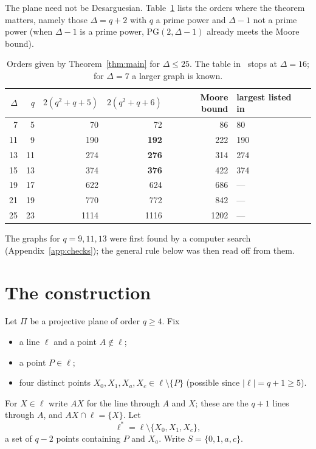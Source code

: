 \documentclass[11pt]{amsart}
\theoremstyle{remark}
\newcommand{\PG}{\mathrm{PG}}
\begin{document}
The plane need not be Desarguesian. Table~\ref{tab:values} lists the orders where the theorem matters, namely those $\Delta = q+2$ with $q$ a prime power and $\Delta - 1$ not a prime power (when $\Delta-1$ is a prime power, $\PG(2,\Delta-1)$ already meets the Moore bound).

\begin{table}[h]
\centering
\begin{tabular}{rrrrrl}
\toprule
$\Delta$ & $q$ & $2(q^2+q+5)$ & $2(q^2+q+6)$ & Moore bound & largest listed in~\cite{wiki}\\
\midrule
7 & 5 & 70 & 72 & 86 & 80 \\
11 & 9 & 190 & \textbf{192} & 222 & 190 \\
13 & 11 & 274 & \textbf{276} & 314 & 274 \\
15 & 13 & 374 & \textbf{376} & 422 & 374 \\
19 & 17 & 622 & 624 & 686 & --- \\
21 & 19 & 770 & 772 & 842 & --- \\
25 & 23 & 1114 & 1116 & 1202 & --- \\
\bottomrule
\end{tabular}
\medskip
\caption{Orders given by Theorem~\ref{thm:main} for $\Delta \le 25$. The table in~\cite{wiki} stops at $\Delta = 16$; for $\Delta = 7$ a larger graph is known.}
\label{tab:values}
\end{table}

The graphs for $q = 9, 11, 13$ were first found by a computer search (Appendix~\ref{app:checks}); the general rule below was then read off from them.

\section{The construction}\label{sec:construction}

Let $\Pi$ be a projective plane of order $q \ge 4$. Fix
\begin{itemize}[leftmargin=2em]
\item a line $\ell$ and a point $A \notin \ell$;
\item a point $P \in \ell$;
\item four distinct points $X_0, X_1, X_a, X_c \in \ell \setminus \{P\}$ (possible since $|\ell| = q+1 \ge 5$).
\end{itemize}
For $X \in \ell$ write $AX$ for the line through $A$ and $X$; these are the $q+1$ lines through $A$, and $AX \cap \ell = \{X\}$. Let
\[ \ell^* = \ell \setminus \{X_0, X_1, X_c\}, \]
a set of $q-2$ points containing $P$ and $X_a$. Write $S = \{0,1,a,c\}$.
\end{document}
